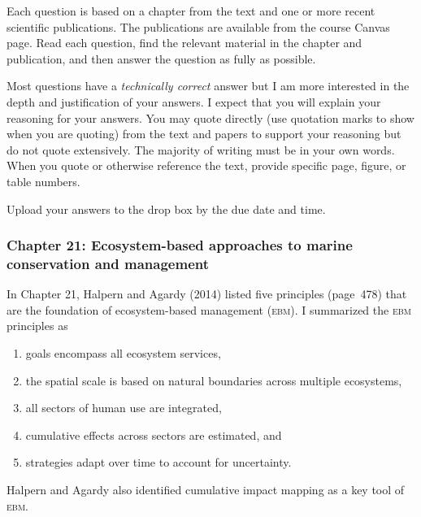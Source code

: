 \documentclass[12pt, addpoints]{exam}
\begin{document}
Each question is based on a chapter from the text and one or more recent scientific publications. 
The publications are available from the course Canvas page. Read each question, find the 
relevant material in the chapter and publication, and then answer the question as fully
as possible.

Most questions have a \emph{technically correct} answer but I am more interested in
the depth and justification of your answers. I expect that you will explain your reasoning 
for your answers. You may quote directly (use quotation marks to  show when you are quoting) from the text and papers to 
support your reasoning but do not quote extensively. The majority of writing must be in
your own words. When you quote or otherwise reference the text, provide specific page, figure, or table numbers.

Upload your answers to the drop box by the due date and time.

\subsubsection*{Chapter 21: Ecosystem-based approaches to marine conservation and management}

In Chapter 21, Halpern and Agardy (2014) listed five principles (page~478) that are 
the foundation of ecosystem-based management (\textsc{ebm}). I summarized 
the \textsc{ebm} principles as

\begin{enumerate}[label=\textsc{\alph*}.]
\item goals encompass all ecosystem services,
\item the spatial scale is based on natural boundaries across multiple ecosystems,
\item all sectors of human use are integrated,
\item cumulative effects across sectors are estimated, and
\item strategies adapt over time to account for uncertainty.
\end{enumerate}

Halpern and Agardy also identified cumulative impact mapping as a key tool of \textsc{ebm.}
\end{document}
